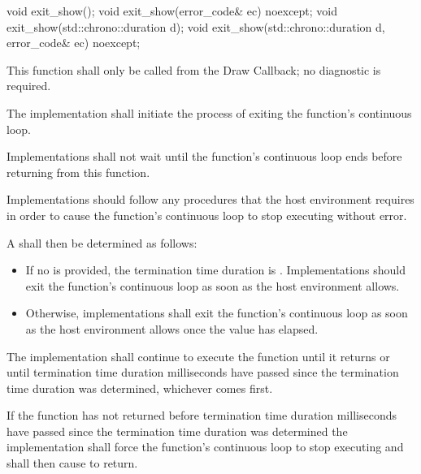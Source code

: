 \begin{itemdecl}
void exit_show();
void exit_show(error_code& ec) noexcept;
void exit_show(std::chrono::duration d);
void exit_show(std::chrono::duration d, error_code& ec) noexcept;
\end{itemdecl}
\begin{itemdescr}
\pnum
\requires
This function shall only be called from the Draw Callback; no diagnostic is required.

\pnum
\effects
The implementation shall initiate the process of exiting the  function's continuous loop.

\pnum
Implementations shall not wait until the  function's continuous loop ends before returning from this function.

\pnum
Implementations should follow any procedures that the host environment requires in order to cause the  function's continuous loop to stop executing without error.

\pnum
A  shall then be determined as follows:
\begin{itemize}
\item If no  is provided, the termination time duration is \unspecnorm. Implementations should exit the  function's continuous loop as soon as the host environment allows.
\item Otherwise, implementations shall exit the  function's continuous loop as soon as the host environment allows once the  value has elapsed.
\end{itemize}

\pnum
The implementation shall continue to execute the  function until it returns or until termination time duration milliseconds have passed since the termination time duration was determined, whichever comes first.

\pnum
If the  function has not returned before termination time duration milliseconds have passed since the termination time duration was determined the implementation shall force the  function's continuous loop to stop executing and shall then cause  to return.
\end{itemdescr}

